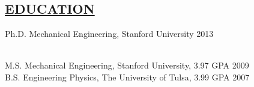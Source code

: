 \documentclass[line,margin]{res}
\newcommand{\CVOnly}[1]{}
\newcommand{\CVOnly}[1]{#1}
\begin{document}
\address{469 Homer Ave, Palo Alto, CA 94301}
\address{650.762.6844}
\address{adamleeper@gmail.com}
\address{www.adamleeper.com}


\begin{resume}

\section{\underline{EDUCATION}}
\vspace{1.0pc}
Ph.D. Mechanical Engineering, Stanford University
\hfill 2013%
\CVOnly{ {\small
\\[0.0pc]{\bf Advisor:} Professor Kenneth Salisbury
\\[0.0pc]{\bf Thesis:} Robot Telemanipulation in Unstructured Environments: Sensors, Algorithms, Interfaces.
\\[-0.6pc]} }
%
\\[0.0pc]M.S. Mechanical Engineering, Stanford University, 3.97 GPA \hfill  2009
\\[0.0pc] B.S. Engineering Physics, The University of Tulsa, 3.99 GPA \hfill 2007
%
%

\end{resume}
\end{document}
